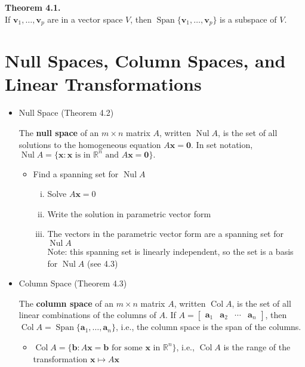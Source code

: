 \documentclass[10pt]{book}
\newenvironment{boxthm}{\begin{mdframed}[backgroundcolor=gray!30,nobreak=true]}{\end{mdframed}}
\newenvironment{boxdef}{\begin{mdframed}[backgroundcolor=gray!30,linewidth=0pt,nobreak=true]}{\end{mdframed}}
\newcommand{\R}{\mathbb{R}}
\newcommand{\vect}[1]{\ensuremath{\boldsymbol{\mathbf{#1}}}}
\DeclareMathOperator{\Span}{Span}
\DeclareMathOperator{\Nul}{Nul}
\DeclareMathOperator{\Col}{Col}
\newcommand{\Axb}{A\vect{x}=\vect{b}}
\newcommand{\Axz}{A\vect{x}=\vect{0}}
\newcommand{\Ax}{A\vect{x}}
\newcommand{\vectset}[3][v]{\{\vect{#1}_{#2},\ldots,\vect{#1}_{#3}\}}
\begin{document}
\begin{boxthm}
	\textbf{Theorem 4.1.} \\
	If $\vect{v}_1,\ldots,\vect{v}_p$ are in a vector space $V$, then $\Span\{\vect{v}_1,\ldots,\vect{v}_p\}$ is a subspace of $V$.
\end{boxthm}


\newpage


\section[Null Spaces, Column Spaces, \& Linear Trans.]{Null Spaces, Column Spaces, and Linear Transformations}
\begin{itemize}
	\item Null Space (Theorem 4.2)
	\begin{boxdef}
		The \textbf{null space} of an $m\times n$ matrix $A$, written $\Nul A$, is the set of all solutions to the homogeneous equation $\Axz$. In set notation,
		$\Nul A = \{\vect{x}:\vect{x} \text{ is in } \R^n \text{ and } \Axz \}.$
	\end{boxdef}
		\begin{itemize}
			\item Find a spanning set for $\Nul A$
				\begin{enumerate}[(i)]
					\item Solve $\Ax=0$
					\item Write the solution in parametric vector form
					\item The vectors in the parametric vector form are a spanning set for $\Nul A$ \\
					Note: this spanning set is linearly independent, so the set is a basis for $\Nul A$ (see 4.3)
				\end{enumerate}
		\end{itemize}
	\item Column Space (Theorem 4.3)
	\begin{boxdef}
		The \textbf{column space} of an $m\times n$ matrix $A$, written $\Col A$, is the set of all linear combinations of the columns of $A$. If $A=\begin{bmatrix}\vect{a}_1&\vect{a}_2&\cdots&\vect{a}_n\end{bmatrix}$, then $\Col A=\Span\vectset[a]{1}{n}$, i.e., the column space is the span of the columns.
	\end{boxdef}
		\begin{itemize}
			\item $\Col A = \{ \vect{b} : \Axb \text{ for some } \vect{x} \text{ in } \R^n\}$, i.e., $\Col A$ is the range of the transformation $\vect{x}\mapsto A\vect{x}$

\end{itemize}
\end{itemize}
\end{document}
